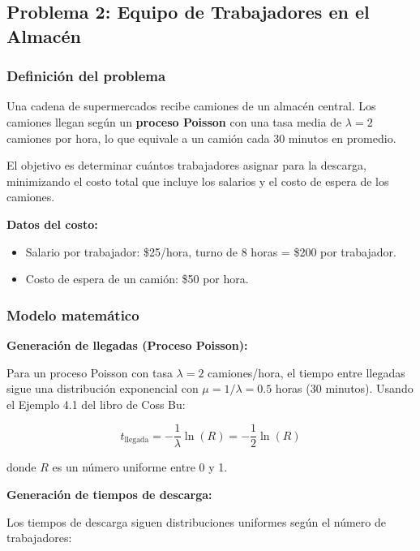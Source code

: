 \documentclass[12pt,a4paper]{article}
\begin{document}
\newpage

\subsection{Problema 2: Equipo de Trabajadores en el Almacén}

\subsubsection{Definición del problema}

Una cadena de supermercados recibe camiones de un almacén central. Los camiones llegan según un \textbf{proceso Poisson} con una tasa media de $\lambda = 2$ camiones por hora, lo que equivale a un camión cada 30 minutos en promedio.

El objetivo es determinar cuántos trabajadores asignar para la descarga, minimizando el costo total que incluye los salarios y el costo de espera de los camiones.

\textbf{Datos del costo:}
\begin{itemize}
  \item Salario por trabajador: \$25/hora, turno de 8 horas = \$200 por trabajador.
  \item Costo de espera de un camión: \$50 por hora.
\end{itemize}

\subsubsection{Modelo matemático}

\textbf{Generación de llegadas (Proceso Poisson):}

Para un proceso Poisson con tasa $\lambda = 2$ camiones/hora, el tiempo entre llegadas sigue una distribución exponencial con $\mu = 1/\lambda = 0.5$ horas (30 minutos). Usando el Ejemplo 4.1 del libro de Coss Bu:

\begin{formulabox}
\[
t_{\text{llegada}} = -\frac{1}{\lambda}\ln(R) = -\frac{1}{2}\ln(R)
\]

donde $R$ es un número uniforme entre 0 y 1.
\end{formulabox}

\textbf{Generación de tiempos de descarga:}

Los tiempos de descarga siguen distribuciones uniformes según el número de trabajadores:
\end{document}
